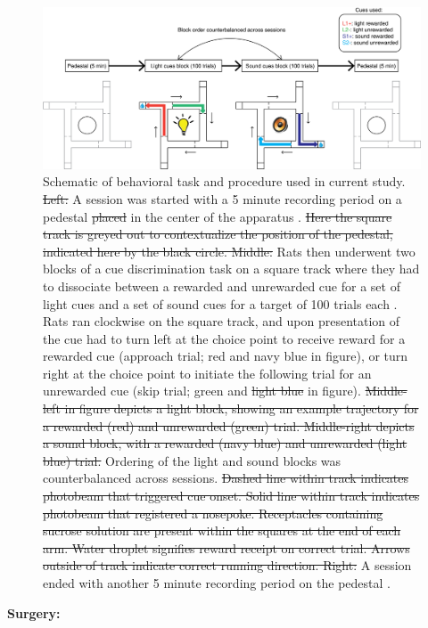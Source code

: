 \documentclass[11pt]{article}
\providecommand{\DIFadd}[1]{{\protect\color{blue}\uwave{#1}}} %
\providecommand{\DIFdel}[1]{{\protect\color{red}\sout{#1}}}                      %
\providecommand{\DIFaddFL}[1]{\DIFadd{#1}} %
\providecommand{\DIFdelFL}[1]{\DIFdel{#1}} %
\providecommand{\DIFaddbeginFL}{} %
\providecommand{\DIFaddendFL}{} %
\providecommand{\DIFdelbeginFL}{} %
\providecommand{\DIFdelendFL}{} %
\newcommand{\DIFscaledelfig}{0.5}
\newlength{\DIFdelgraphicswidth} %
\newlength{\DIFdelgraphicsheight} %
\newcommand{\DIFaddincludegraphics}[2][]{{\color{blue}\fbox{\DIFOincludegraphics[#1]{#2}}}} %
\newcommand{\DIFdelincludegraphics}[2][]{%
\sbox{\DIFdelgraphicsbox}{\DIFOincludegraphics[#1]{#2}}%
\settoboxwidth{\DIFdelgraphicswidth}{\DIFdelgraphicsbox} %
\settoboxtotalheight{\DIFdelgraphicsheight}{\DIFdelgraphicsbox} %
\scalebox{\DIFscaledelfig}{%
\parbox[b]{\DIFdelgraphicswidth}{\usebox{\DIFdelgraphicsbox}\\[-\baselineskip] \rule{\DIFdelgraphicswidth}{0em}}\llap{\resizebox{\DIFdelgraphicswidth}{\DIFdelgraphicsheight}{%
\setlength{\unitlength}{\DIFdelgraphicswidth}%
\begin{picture}(1,1)%
\thicklines\linethickness{2pt} %
{\color[rgb]{1,0,0}\put(0,0){\framebox(1,1){}}}%
{\color[rgb]{1,0,0}\put(0,0){\line( 1,1){1}}}%
{\color[rgb]{1,0,0}\put(0,1){\line(1,-1){1}}}%
\end{picture}%
}\hspace*{3pt}}} %
} %
\DeclareRobustCommand{\DIFaddbeginFL}{\DIFOaddbeginFL \let\includegraphics\DIFaddincludegraphics} %
\DeclareRobustCommand{\DIFaddendFL}{\DIFOaddendFL \let\includegraphics\DIFOincludegraphics} %
\DeclareRobustCommand{\DIFdelbeginFL}{\DIFOdelbeginFL \let\includegraphics\DIFdelincludegraphics} %
\DeclareRobustCommand{\DIFdelendFL}{\DIFOaddendFL \let\includegraphics\DIFOincludegraphics} %
\begin{document}
\begin{figure}[h]
\centering
\includegraphics[width=\textwidth]{Fig 2 - Schematic task.png}
\caption{Schematic of behavioral task and procedure used in current study. \DIFdelbeginFL \DIFdelFL{Left: }\DIFdelendFL A session was started with a 5 minute recording period on a pedestal \DIFdelbeginFL \DIFdelFL{placed }\DIFdelendFL \DIFaddbeginFL \DIFaddFL{place }\DIFaddendFL in the center of the apparatus \DIFaddbeginFL \DIFaddFL{(left)}\DIFaddendFL . \DIFdelbeginFL \DIFdelFL{Here the square track is greyed out to contextualize the position of the pedestal, indicated here by the black circle. Middle: }\DIFdelendFL Rats then underwent two blocks of a cue discrimination task on a square track where they had to dissociate between a rewarded and unrewarded cue for a set of light cues and a set of sound cues for a target of 100 trials each \DIFaddbeginFL \DIFaddFL{(middle)}\DIFaddendFL . Rats ran clockwise on the square track, and upon presentation of the cue had to turn left at the choice point to receive reward for a rewarded cue (approach trial; red and navy blue in figure), or turn right at the choice point to initiate the following trial for an unrewarded cue (skip trial; green and \DIFdelbeginFL \DIFdelFL{light blue }\DIFdelendFL \DIFaddbeginFL \DIFaddFL{cyan }\DIFaddendFL in figure). \DIFdelbeginFL \DIFdelFL{Middle-left in figure depicts a light block, showing an example trajectory for a rewarded (red) and unrewarded (green) trial. Middle-right depicts a sound block, with a rewarded (navy blue) and unrewarded (light blue) trial. }\DIFdelendFL Ordering of the light and sound blocks was counterbalanced across sessions. \DIFdelbeginFL \DIFdelFL{Dashed line within track indicates photobeam that triggered cue onset. Solid line within track indicates photobeam that registered a nosepoke. Receptacles containing sucrose solution are present within the squares at the end of each arm. Water droplet signifies reward receipt on correct trial. Arrows outside of track indicate correct running direction. Right: }\DIFdelendFL A session ended with another 5 minute recording period on the pedestal \DIFaddbeginFL \DIFaddFL{(right)}\DIFaddendFL .}
\label{fig:task}
\end{figure}
{\bf Surgery:}
\end{document}
